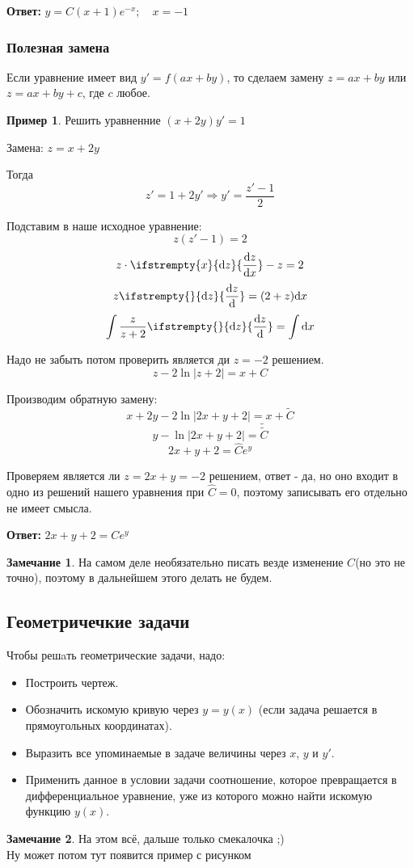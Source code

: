 \documentclass[a4paper, 14pt]{article}
\newcommand{\dx}{\mathrm{d}x}
\newcommand{\dv}[2]{%
  \ifstrempty{#2}%
    {\mathrm{d}#1}%
    {\frac{\mathrm{d}#1}{\mathrm{d}#2}}%
}
\theoremstyle{definition}
\newtheorem*{remark}{Замечание}
\newtheorem*{example}{Пример}
\newenvironment{answer}
  {\par\noindent\textbf{Ответ:}}
  {\par}
\begin{document}
\begin{answer}
$y = C(x+1)e^{-x}; \quad x=-1 $
\end{answer}

\subsubsection{Полезная замена}
Если уравнение имеет вид $y' = f(ax+by)$, то сделаем замену $z = ax+by$ или $z = ax+by+c$, где $c$ любое.
\begin{example}
    Решить уравненние $(x+2y)y'=1$
    
    Замена: $z = x+2y$
    
    Тогда \[z'=1+2y' \Longrightarrow y'=\frac{z'-1}{2}\]
    
    Подставим в наше исходное уравнение:
    \[z(z'-1)=2\]
    \[z \cdot \dv{z}{x} - z = 2\]
    \[z\dv{z}{} = (2+z)\dx\]
    \[\int{\frac{z}{z+2} \dv{z}{}} = \int{\dx}\]
    
    Надо не забыть потом проверить является ди $z = -2$ решением.
    \[z-2\ln{|z+2|} = x + C\]
    
    Производим обратную замену:
    \[x + 2y - 2\ln{|2x+y+2|} =x + \tilde{C}\]
    \[y - \ln{|2x+y+2|} =\tilde{\tilde{C}}\]
    \[2x+y+2 = \hat{C}e^y\]
    
    Проверяем является ли $z = 2x+y = -2$ решением, ответ - да, но оно входит в одно из решений нашего уравнения при $\hat{C} = 0$, поэтому записывать его отдельно не имеет смысла.
\end{example}
\begin{answer}
$2x+y+2 = Ce^y$
\end{answer}
\begin{remark}
    На самом деле необязательно писать везде изменение $C$(но это не точно), поэтому в дальнейшем этого делать не будем.
\end{remark}
\newpage
\subsection{Геометричечкие задачи}

Чтобы решaть геометрические задачи, надо:
\begin{itemize}
\item \textbf{}Построить чертеж.
\item \textbf{}Обозначить искомую кривую через $y = y(x)$ (если задача решается в прямоугольных координатах).
\item \textbf{}Выразить все упоминаемые в задаче величины через $x$, $y$ и $y'$.
\item \textbf{}Применить данное в условии задачи соотношение, которое превращается в дифференциальное уравнение, уже из которого можно найти искомую функцию $y(x)$.
\end{itemize}
\begin{remark}
    На этом всё, дальше только смекалочка ;)\\
    Ну может потом тут появится пример с рисунком  
\end{remark}
\end{document}
